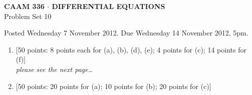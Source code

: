 \documentclass[10pt]{article}
\begin{document}
\begin{center}
\large \textsf{\textbf{CAAM 336 $\cdot$ DIFFERENTIAL EQUATIONS}\\[0.5em]
 Problem Set 10 }
\end{center}

Posted Wednesday 7 November 2012.  Due Wednesday 14 November 2012, 5pm.

\begin{enumerate}
\item {[50 points: 8 points each for (a), (b), (d), (e); 4 points for (c); 14 points for (f)]}\\  

\hfill \emph{please see the next page\ldots}
\newpage
\item {[50 points: 20 points for (a); 10 points for (b); 20 points for (c)]}\\  

\end{enumerate}
\end{document}
